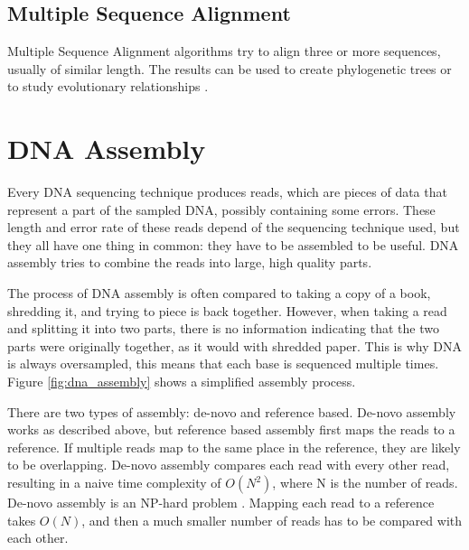 \documentclass[../main/thesis.tex]{subfiles}
\begin{document}
\subsection{Multiple Sequence Alignment}
Multiple Sequence Alignment algorithms \cite{MSA_survey} try to align three or more sequences, usually of similar length.
The results can be used to create phylogenetic trees or to study evolutionary relationships \cite{MSA}.


\section{DNA Assembly}\label{sec:dna_assembly}
Every DNA sequencing technique produces reads, which are pieces of data that represent a part of the sampled DNA, possibly containing some errors.
These length and error rate of these reads depend of the sequencing technique used, but they all have one thing in common: they have to be assembled to be useful.
DNA assembly tries to combine the reads into large, high quality parts.

The process of DNA assembly is often compared to taking a copy of a book, shredding it, and trying to piece is back together.
However, when taking a read and splitting it into two parts, there is no information indicating that the two parts were originally together, as it would with shredded paper.
This is why DNA is always oversampled, this means that each base is sequenced multiple times.
Figure \ref{fig:dna_assembly} shows a simplified assembly process.


There are two types of assembly: de-novo and reference based.
De-novo assembly works as described above, but reference based assembly first maps the reads to a reference.
If multiple reads map to the same place in the reference, they are likely to be overlapping.
De-novo assembly compares each read with every other read, resulting in a naive time complexity of $O(N^2)$, where N is the number of reads.
De-novo assembly is an NP-hard problem \cite{denovo_NP}.
Mapping each read to a reference takes $O(N)$, and then a much smaller number of reads has to be compared with each other.
\end{document}
